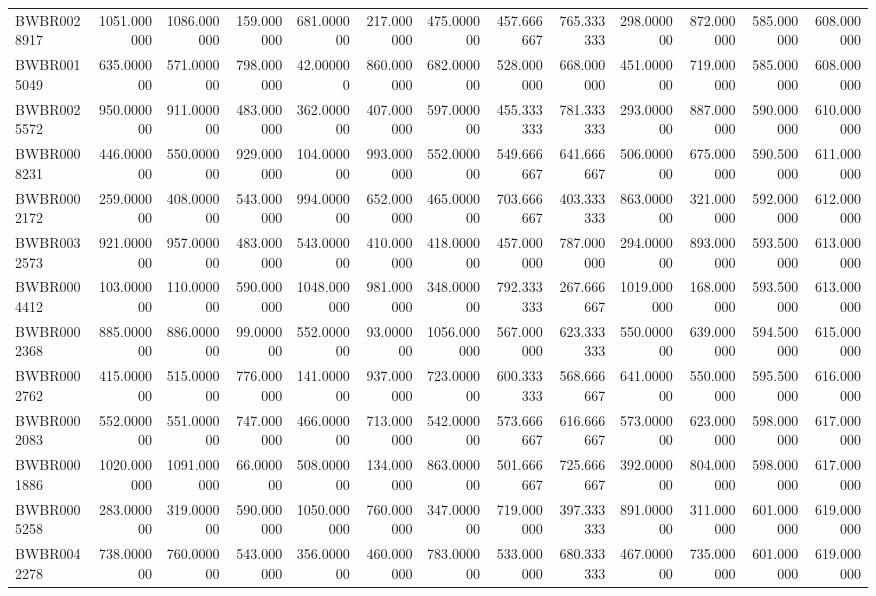 \begin{longtable}{lrrrrrrrrrrrr}
BWBR0028917 & 1051.000000 & 1086.000000 & 159.000000 & 681.000000 & 217.000000 & 475.000000 & 457.666667 & 765.333333 & 298.000000 & 872.000000 & 585.000000 & 608.000000 \\
BWBR0015049 & 635.000000 & 571.000000 & 798.000000 & 42.000000 & 860.000000 & 682.000000 & 528.000000 & 668.000000 & 451.000000 & 719.000000 & 585.000000 & 608.000000 \\
BWBR0025572 & 950.000000 & 911.000000 & 483.000000 & 362.000000 & 407.000000 & 597.000000 & 455.333333 & 781.333333 & 293.000000 & 887.000000 & 590.000000 & 610.000000 \\
BWBR0008231 & 446.000000 & 550.000000 & 929.000000 & 104.000000 & 993.000000 & 552.000000 & 549.666667 & 641.666667 & 506.000000 & 675.000000 & 590.500000 & 611.000000 \\
BWBR0002172 & 259.000000 & 408.000000 & 543.000000 & 994.000000 & 652.000000 & 465.000000 & 703.666667 & 403.333333 & 863.000000 & 321.000000 & 592.000000 & 612.000000 \\
BWBR0032573 & 921.000000 & 957.000000 & 483.000000 & 543.000000 & 410.000000 & 418.000000 & 457.000000 & 787.000000 & 294.000000 & 893.000000 & 593.500000 & 613.000000 \\
BWBR0004412 & 103.000000 & 110.000000 & 590.000000 & 1048.000000 & 981.000000 & 348.000000 & 792.333333 & 267.666667 & 1019.000000 & 168.000000 & 593.500000 & 613.000000 \\
BWBR0002368 & 885.000000 & 886.000000 & 99.000000 & 552.000000 & 93.000000 & 1056.000000 & 567.000000 & 623.333333 & 550.000000 & 639.000000 & 594.500000 & 615.000000 \\
BWBR0002762 & 415.000000 & 515.000000 & 776.000000 & 141.000000 & 937.000000 & 723.000000 & 600.333333 & 568.666667 & 641.000000 & 550.000000 & 595.500000 & 616.000000 \\
BWBR0002083 & 552.000000 & 551.000000 & 747.000000 & 466.000000 & 713.000000 & 542.000000 & 573.666667 & 616.666667 & 573.000000 & 623.000000 & 598.000000 & 617.000000 \\
BWBR0001886 & 1020.000000 & 1091.000000 & 66.000000 & 508.000000 & 134.000000 & 863.000000 & 501.666667 & 725.666667 & 392.000000 & 804.000000 & 598.000000 & 617.000000 \\
BWBR0005258 & 283.000000 & 319.000000 & 590.000000 & 1050.000000 & 760.000000 & 347.000000 & 719.000000 & 397.333333 & 891.000000 & 311.000000 & 601.000000 & 619.000000 \\
BWBR0042278 & 738.000000 & 760.000000 & 543.000000 & 356.000000 & 460.000000 & 783.000000 & 533.000000 & 680.333333 & 467.000000 & 735.000000 & 601.000000 & 619.000000 \\

\end{longtable}
